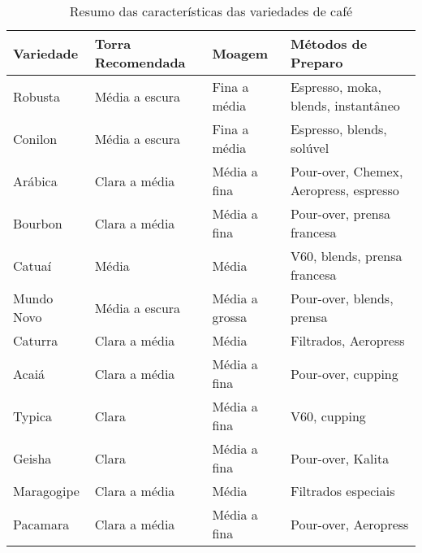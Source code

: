 \documentclass[a4paper,12pt]{article}
\begin{document}
\begin{table}[h!]
\centering
\caption{Resumo das características das variedades de café}
\begin{tabular}{|>{\raggedright\arraybackslash}p{3.5cm}|>{\raggedright\arraybackslash}p{2.5cm}|>{\raggedright\arraybackslash}p{2.5cm}|>{\raggedright\arraybackslash}p{4cm}|}
\hline
\textbf{Variedade} & \textbf{Torra Recomendada} & \textbf{Moagem} & \textbf{Métodos de Preparo} \\
\hline
Robusta & Média a escura & Fina a média & Espresso, moka, blends, instantâneo \\
\hline
Conilon & Média a escura & Fina a média & Espresso, blends, solúvel \\
\hline
Arábica & Clara a média & Média a fina & Pour-over, Chemex, Aeropress, espresso \\
\hline
Bourbon & Clara a média & Média a fina & Pour-over, prensa francesa \\
\hline
Catuaí & Média & Média & V60, blends, prensa francesa \\
\hline
Mundo Novo & Média a escura & Média a grossa & Pour-over, blends, prensa \\
\hline
Caturra & Clara a média & Média & Filtrados, Aeropress \\
\hline
Acaiá & Clara a média & Média a fina & Pour-over, cupping \\
\hline
Typica & Clara & Média a fina & V60, cupping \\
\hline
Geisha & Clara & Média a fina & Pour-over, Kalita \\
\hline
Maragogipe & Clara a média & Média & Filtrados especiais \\
\hline
Pacamara & Clara a média & Média a fina & Pour-over, Aeropress \\
\hline
\end{tabular}
\end{table}




\nocite{counterculture_pourover}
\nocite{embrapa_catalog}
\nocite{perfectdailygrind_geisha}
\nocite{sca_brewing_chart}
\nocite{sca_standard_pdf}
\nocite{wcr_varieties}
\nocite{wikipedia_geisha}
\end{document}
